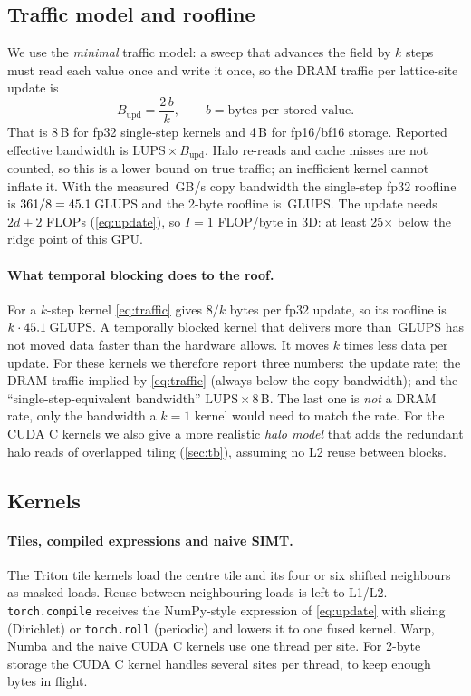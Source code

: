 \documentclass[11pt]{article}
\newcommand{\GLUPS}{\,GLUPS}
\newcommand{\code}[1]{\texttt{#1}}
\begin{document}
\subsection{Traffic model and roofline}
\label{sec:traffic}
We use the \emph{minimal} traffic model: a sweep that advances the field by $k$ steps must read
each value once and write it once, so the DRAM traffic per lattice-site update is
\begin{equation}
B_{\text{upd}} = \frac{2\,b}{k},\qquad b=\text{bytes per stored value}.
\label{eq:traffic}
\end{equation}
That is 8\,B for fp32 single-step kernels and 4\,B for fp16/bf16 storage. Reported effective
bandwidth is $\text{LUPS}\times B_{\text{upd}}$. Halo re-reads and cache misses are not counted,
so this is a lower bound on true traffic; an inefficient kernel cannot inflate it. With the
measured \copyBW\,GB/s copy bandwidth the single-step fp32 roofline is
$361/8=45.1$\GLUPS{} and the 2-byte roofline is \rooflineHalf\GLUPS. The update needs
$2d+2$ FLOPs (\cref{eq:update}), so $I=1$ FLOP/byte in 3D: at least 25$\times$ below the ridge
point of this GPU.

\paragraph{What temporal blocking does to the roof.}
For a $k$-step kernel \cref{eq:traffic} gives $8/k$ bytes per fp32 update, so its roofline is
$k\cdot45.1$\GLUPS. A temporally blocked kernel that delivers more than \rooflineFP\GLUPS{}
has not moved data faster than the hardware allows. It moves $k$ times less data per update.
For these kernels we therefore report three numbers: the update rate; the DRAM traffic implied
by \cref{eq:traffic} (always below the copy bandwidth); and the ``single-step-equivalent
bandwidth'' $\text{LUPS}\times 8$\,B. The last one is \emph{not} a DRAM rate, only the
bandwidth a $k=1$ kernel would need to match the rate. For the CUDA C kernels we also give a
more realistic \emph{halo model} that adds the redundant halo reads of overlapped tiling
(\cref{sec:tb}), assuming no L2 reuse between blocks.

\subsection{Kernels}
\paragraph{Tiles, compiled expressions and naive SIMT.}
The Triton tile kernels load the centre tile and its four or six shifted neighbours as masked
loads. Reuse between neighbouring loads is left to L1/L2. \code{torch.compile} receives the
NumPy-style expression of \cref{eq:update} with slicing (Dirichlet) or \code{torch.roll}
(periodic) and lowers it to one fused kernel. Warp, Numba and the naive CUDA C kernels use one
thread per site. For 2-byte storage the CUDA C kernel handles several sites per thread, to keep
enough bytes in flight.
\end{document}
